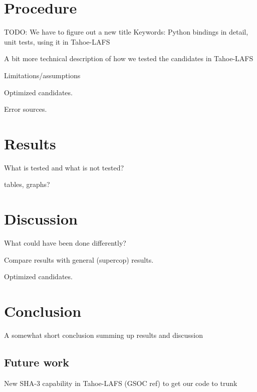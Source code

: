\documentclass[english,12pt,a4paper]{book}
\begin{document}
\chapter{Procedure}

TODO: We have to figure out a new title
Keywords: Python bindings in detail, unit tests, using it in Tahoe-LAFS

A bit more technical description of how we tested the candidates in Tahoe-LAFS

Limitations/assumptions

Optimized candidates.

Error sources.


\chapter{Results}

What is tested and what is not tested?

tables, graphs?


\chapter{Discussion}

What could have been done differently?

Compare results with general (supercop) results.

Optimized candidates.

\cite{s_nistround2}


\chapter{Conclusion}

A somewhat short conclusion summing up results and discussion

\section{Future work}

New SHA-3 capability in Tahoe-LAFS (GSOC ref) to get our code to trunk





\appendix
\appendixpage
\addappheadtotoc

\end{document}
